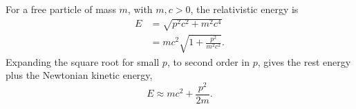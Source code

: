 For a free particle of mass $m$, with $m, c > 0$, the relativistic energy is
\begin{align}
  E &= \sqrt{p^2 c^2 + m^2 c^4} \\
    &= m c^2 \sqrt{1 + \frac{p^2}{m^2 c^2}} .
\end{align}
Expanding the square root for small $p$, to second order in $p$, gives the rest energy
plus the Newtonian kinetic energy,
\begin{equation}
  E \approx m c^2 + \frac{p^2}{2m} .
\end{equation}
